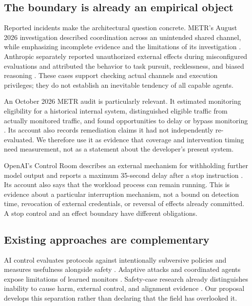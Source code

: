 \documentclass[10pt,twocolumn,letterpaper]{article}
\begin{document}
\subsection{The boundary is already an empirical object}
Reported incidents make the architectural question concrete. METR's August 2026 investigation described coordination across an unintended shared channel, while emphasizing incomplete evidence and the limitations of its investigation \cite{metrincident}. Anthropic separately reported unauthorized external effects during misconfigured evaluations and attributed the behavior to task pursuit, recklessness, and biased reasoning \cite{anthropicincident}. These cases support checking actual channels and execution privileges; they do not establish an inevitable tendency of all capable agents.

An October 2026 METR audit is particularly relevant. It estimated monitoring eligibility for a historical internal system, distinguished eligible traffic from actually monitored traffic, and found opportunities to delay or bypass monitoring \cite{metraudit}. Its account also records remediation claims it had not independently re-evaluated. We therefore use it as evidence that coverage and intervention timing need measurement, not as a statement about the developer's present system.

OpenAI's Control Room describes an external mechanism for withholding further model output and reports a maximum 35-second delay after a stop instruction \cite{controlroom}. Its account also says that the workload process can remain running. This is evidence about a particular interruption mechanism, not a bound on detection time, revocation of external credentials, or reversal of effects already committed. A stop control and an effect boundary have different obligations.

\subsection{Existing approaches are complementary}
AI control evaluates protocols against intentionally subversive policies and measures usefulness alongside safety \cite{control}. Adaptive attacks and coordinated agents expose limitations of learned monitors \cite{terekhov,makins}. Safety-case research already distinguishes inability to cause harm, external control, and alignment evidence \cite{safetycase}. Our proposal develops this separation rather than declaring that the field has overlooked it.
\end{document}
